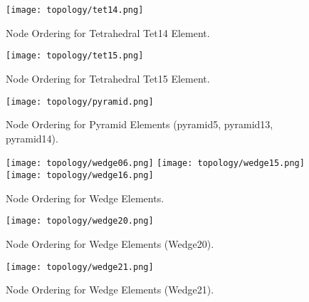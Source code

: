 \begin{figure}
\begin{center}
\texttt{[image: topology/tet14.png]}
\caption{Node Ordering for Tetrahedral Tet14 Element.}\label{topology:tet14}
\end{center}
\end{figure}


\begin{figure}
\begin{center}
\texttt{[image: topology/tet15.png]}
\caption{Node Ordering for Tetrahedral Tet15 Element.}\label{topology:tet15}
\end{center}
\end{figure}

\begin{figure}
\begin{center}
\texttt{[image: topology/pyramid.png]}
\caption{Node Ordering for Pyramid Elements (pyramid5, pyramid13, pyramid14).}\label{topology:pyramid}
\end{center}
\end{figure}


\begin{figure}
\begin{center}
{\texttt{[image: topology/wedge06.png]}}
{\texttt{[image: topology/wedge15.png]}}
{\texttt{[image: topology/wedge16.png]}}
\caption{Node Ordering for Wedge Elements.}\label{topology:wedge}
\end{center}
\end{figure}

\begin{figure}
\begin{center}
\texttt{[image: topology/wedge20.png]}
\caption{Node Ordering for Wedge Elements (Wedge20).}\label{topology:wedge20}
\end{center}
\end{figure}


\begin{figure}
\begin{center}
\texttt{[image: topology/wedge21.png]}
\caption{Node Ordering for Wedge Elements (Wedge21).}\label{topology:wedge21}
\end{center}
\end{figure}

